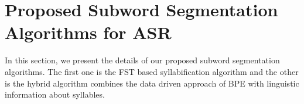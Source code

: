 

\section{Proposed Subword Segmentation Algorithms for ASR}
\label{sec:sbpe}
In this section, we present the details of our proposed subword segmentation algorithms. The first one is the FST based syllabification algorithm and the other is the hybrid algorithm combines the data driven approach of BPE with linguistic information about syllables.





